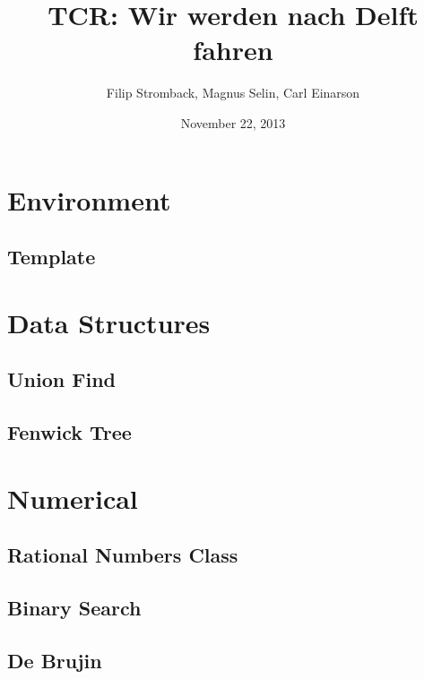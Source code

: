 \documentclass{article}
\title{TCR: Wir werden nach Delft fahren}
\date{November 22, 2013}
\author{Filip Stromback, Magnus Selin, Carl Einarson}
\begin{document}
\maketitle
\begin{multicols}{2}
\tableofcontents
\end{multicols}
\newpage
\scriptsize



\begin{multicols}{3}

\section{Environment}
\subsection{Template}


\section{Data Structures}
\subsection{Union Find}



\subsection{Fenwick Tree}


\section{Numerical}
\subsection{Rational Numbers Class}


\subsection{Binary Search}


\subsection{De Brujin}



\end{multicols}
\end{document}
